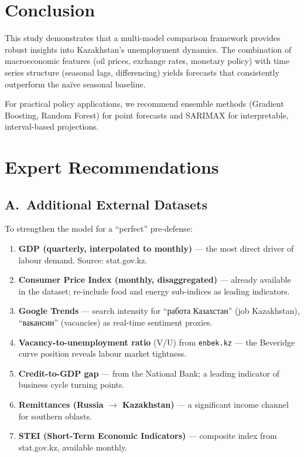 \documentclass[12pt,a4paper]{article}
\begin{document}
\begin{table}[H]
\begin{table}[H]
\section{Conclusion}

This study demonstrates that a multi-model comparison framework
provides robust insights into Kazakhstan's unemployment dynamics.
The combination of macroeconomic features (oil prices, exchange rates,
monetary policy) with time series structure (seasonal lags, differencing)
yields forecasts that consistently outperform the naïve seasonal
baseline.

For practical policy applications, we recommend ensemble methods
(Gradient Boosting, Random Forest) for point forecasts and SARIMAX
for interpretable, interval-based projections.


\section*{Expert Recommendations}
\label{sec:expert}

\subsection*{A.~Additional External Datasets}

To strengthen the model for a ``perfect'' pre-defense:

\begin{enumerate}
    \item \textbf{GDP (quarterly, interpolated to monthly)} --- the most
          direct driver of labour demand. Source: stat.gov.kz.
    \item \textbf{Consumer Price Index (monthly, disaggregated)} ---
          already available in the dataset; re-include food and energy
          sub-indices as leading indicators.
    \item \textbf{Google Trends} --- search intensity for
          ``\foreignlanguage{english}{работа Казахстан}'' (job Kazakhstan),
          ``\foreignlanguage{english}{вакансии}'' (vacancies) as
          real-time sentiment proxies.
    \item \textbf{Vacancy-to-unemployment ratio} (V/U) from
          \texttt{enbek.kz} --- the Beveridge curve position reveals
          labour market tightness.
    \item \textbf{Credit-to-GDP gap} --- from the National Bank;
          a leading indicator of business cycle turning points.
    \item \textbf{Remittances (Russia $\to$ Kazakhstan)} --- a
          significant income channel for southern oblasts.
    \item \textbf{STEI (Short-Term Economic Indicators)} ---
          composite index from stat.gov.kz, available monthly.
\end{enumerate}


\end{table}
\end{table}
\end{document}
